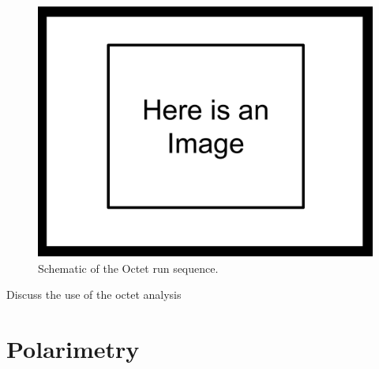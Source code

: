 \begin{figure}[h]
\centering
\includegraphics[scale=.25]{3-UCNAAnalysis/ImageHolder.pdf}
\caption{Schematic of the Octet run sequence.}
\end{figure}

Discuss the use of the octet analysis

\section{Polarimetry}







